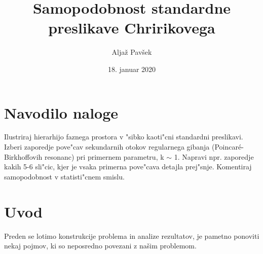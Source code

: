 \documentclass[]{article}
\begin{document}
\title{Samopodobnost standardne preslikave Chririkovega}

\author{Alja\v z  Pav\v sek}

\date{18. januar 2020}

\maketitle

\section{Navodilo naloge}
Ilustriraj hierarhijo faznega prostora v "sibko kaoti"cni standardni preslikavi. Izberi zaporedje pove"cav sekundarnih otokov regularnega gibanja (Poincar\'e-Birkhoffovih resonanc) pri primernem parametru, k $\sim$ 1.
Napravi npr. zaporedje kakih 5-6 sli"cic, kjer je vsaka primerna pove"cava detajla prej"snje. Komentiraj samopodobnost v statisti"cnem smislu.

\section{Uvod}
Preden se lotimo konstrukcije problema in analize rezultatov, je pametno ponoviti nekaj pojmov, ki so neposredno povezani z našim problemom.
\end{document}
